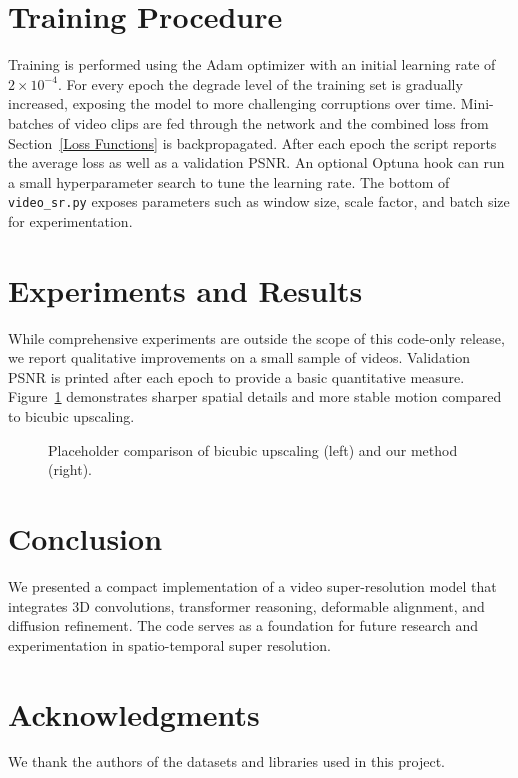 \documentclass{article}
\begin{document}
\section{Training Procedure}
Training is performed using the Adam optimizer with an initial learning rate of $2 \times 10^{-4}$. For every epoch the degrade level of the training set is gradually increased, exposing the model to more challenging corruptions over time. Mini-batches of video clips are fed through the network and the combined loss from Section~\ref{Loss Functions} is backpropagated. After each epoch the script reports the average loss as well as a validation PSNR. An optional Optuna hook can run a small hyperparameter search to tune the learning rate. The bottom of \texttt{video\_sr.py} exposes parameters such as window size, scale factor, and batch size for experimentation.

\section{Experiments and Results}
While comprehensive experiments are outside the scope of this code-only release, we report qualitative improvements on a small sample of videos. Validation PSNR is printed after each epoch to provide a basic quantitative measure. Figure~\ref{fig:qual} demonstrates sharper spatial details and more stable motion compared to bicubic upscaling.

\begin{figure}[h]
\centering
{}
\caption{Placeholder comparison of bicubic upscaling (left) and our method (right).}
\label{fig:qual}
\end{figure}

\section{Conclusion}
We presented a compact implementation of a video super-resolution model that integrates 3D convolutions, transformer reasoning, deformable alignment, and diffusion refinement. The code serves as a foundation for future research and experimentation in spatio-temporal super resolution.

\section*{Acknowledgments}
We thank the authors of the datasets and libraries used in this project.
\end{document}
